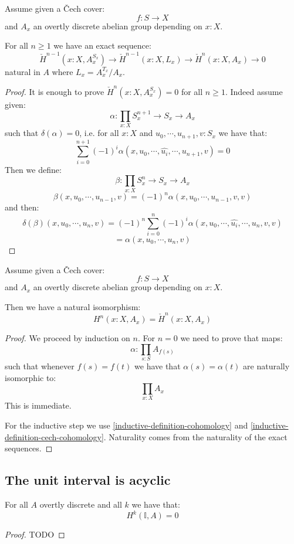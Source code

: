 \begin{lemma}\label{inductive-definition-cech-cohomology}
Assume given a \v{C}ech cover:
\[f:S\to X\]
and $A_x$ an overtly discrete abelian group depending on $x:X$.

For all $n\geq 1$ we have an exact sequence:
\[\check{H}^{n-1}(x:X,A_x^{S_x}) \to \check{H}^{n-1}(x:X,L_x)\to \check{H}^n(x:X,A_x)\to 0\]
natural in $A$ where $L_x=A_x^{T_x}/A_x$.
\end{lemma}

\begin{proof}
It is enough to prove $\check{H}^n(x:X,A_x^{S_x}) = 0$ for all $n\geq 1$. Indeed assume given:
\[\alpha : \prod_{x:X} S_x^{n+1}\to S_x\to A_x\]
such that $\delta(\alpha) = 0$, i.e. for all $x:X$ and $u_0,\cdots, u_{n+1},v:S_x$ we have that:
\[\sum_{i=0}^{n+1}(-1)^i\alpha(x,u_0,\cdots,  \hat{u_i},\cdots ,u_{n+1},v) = 0\]
Then we define:
\[\beta : \prod_{x:X} S_x^{n}\to S_x\to A_x\]
\[\beta(x,u_0,\cdots,u_{n-1},v) = (-1)^n\alpha(x,u_0,\cdots,u_{n-1},v,v)\]
and then:
\[\delta(\beta)(x,u_0,\cdots,u_{n},v) = (-1)^n\sum_{i=0}^{n} (-1)^i \alpha(x,u_0,\cdots,\hat{u_i},\cdots,u_n,v,v) \]
\[= \alpha(x,u_0,\cdots,u_n,v)\]
\end{proof}

\begin{theorem}
Assume given a \v{C}ech cover:
\[f:S\to X\]
and $A_x$ an overtly discrete abelian group depending on $x:X$.

Then we have a natural isomorphism:
\[H^n(x:X,A_x) = \check{H}^n(x:X,A_x)\]
\end{theorem}

\begin{proof}
We proceed by induction on $n$. For $n=0$ we need to prove that maps:
\[\alpha:\prod_{s:S}A_{f(s)}\]
such that whenever $f(s)=f(t)$ we have that $\alpha(s) = \alpha(t)$ are naturally isomorphic to:
\[\prod_{x:X}A_x\]
This is immediate.

For the inductive step we use \cref{inductive-definition-cohomology} and \cref{inductive-definition-cech-cohomology}. Naturality comes from the naturality of the exact sequences.
\end{proof}


\subsection{The unit interval is acyclic}

\begin{proposition}\label{vanishing-cohomology-interval}
For all $A$ overtly discrete and all $k$ we have that:
\[H^k(\mathbb{I},A) = 0\]
\end{proposition}

\begin{proof}
TODO
\end{proof}
